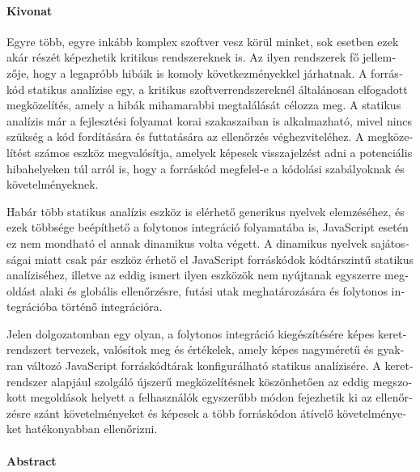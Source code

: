 \begin{otherlanguage}{magyar}

  \paragraph*{Kivonat}
  \thispagestyle{plain}
  {
  \selecthungarian

  Egyre több, egyre inkább komplex szoftver vesz körül minket, sok esetben ezek akár részét képezhetik kritikus rendszereknek is. Az ilyen rendszerek fő jellemzője, hogy a legapróbb hibáik is komoly következményekkel járhatnak. A forráskód statikus analízise egy, a kritikus szoftverrendszereknél általánosan elfogadott megközelítés, amely a hibák mihamarabbi megtalálását célozza meg.  A statikus analízis már a fejlesztési folyamat korai szakaszaiban is alkalmazható, mivel nincs szükség a kód fordítására és futtatására az ellenőrzés véghezviteléhez. A megközelítést számos eszköz megvalósítja, amelyek képesek visszajelzést adni a potenciális hibahelyeken túl arról is, hogy a forráskód megfelel-e a kódolási szabályoknak és követelményeknek.

  Habár több statikus analízis eszköz is elérhető generikus nyelvek elemzéséhez, és ezek többsége beépíthető a folytonos integráció folyamatába is, JavaScript esetén ez nem mondható el annak dinamikus volta végett. A dinamikus nyelvek sajátosságai miatt csak pár eszköz érhető el JavaScript forráskódok kódtárszintű statikus analíziséhez, illetve az eddig ismert ilyen eszközök nem nyújtanak egyszerre megoldást alaki és globális ellenőrzésre, futási utak meghatározására és folytonos integrációba történő integrációra.

  Jelen dolgozatomban egy olyan, a folytonos integráció kiegészítésére képes keretrendszert tervezek, valósítok meg és értékelek, amely képes nagyméretű és gyakran változó JavaScript forráskódtárak konfigurálható statikus analízisére. A keretrendszer alapjául szolgáló újszerű megközelítésnek köszönhetően az eddig megszokott megoldások helyett a felhasználók egyszerűbb módon fejezhetik ki az ellenőrzésre szánt követelményeket és képesek a több forráskódon átívelő követelményeket hatékonyabban ellenőrizni.

  }

\end{otherlanguage}

\cleardoublepage

\paragraph*{Abstract}
{}
\thispagestyle{plain}

